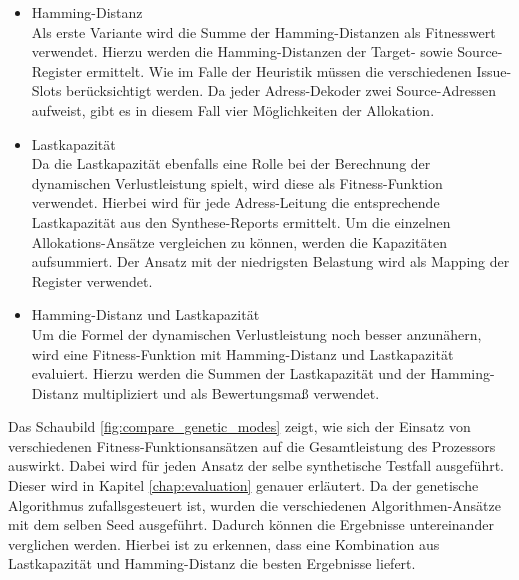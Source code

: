 \begin{itemize}
	\item Hamming-Distanz\\
		Als erste Variante wird die Summe der Hamming-Distanzen als Fitnesswert verwendet. Hierzu werden die Hamming-Distanzen der Target- sowie Source-Register ermittelt. Wie im Falle der Heuristik müssen die verschiedenen Issue-Slots berücksichtigt werden. Da jeder Adress-Dekoder zwei Source-Adressen aufweist, gibt es in diesem Fall vier Möglichkeiten der Allokation.
	\item Lastkapazität\\
		Da die Lastkapazität ebenfalls eine Rolle bei der Berechnung der dynamischen Verlustleistung spielt, wird diese als Fitness-Funktion verwendet. Hierbei wird für jede Adress-Leitung die entsprechende Lastkapazität aus den Synthese-Reports ermittelt. Um die einzelnen Allokations-Ansätze vergleichen zu können, werden die Kapazitäten aufsummiert. Der Ansatz mit der niedrigsten Belastung wird als Mapping der Register verwendet. \\
	\item Hamming-Distanz und Lastkapazität\\
		Um die Formel der dynamischen Verlustleistung noch besser anzunähern, wird eine Fitness-Funktion mit Hamming-Distanz und Lastkapazität evaluiert. Hierzu werden die Summen der Lastkapazität und der Hamming-Distanz multipliziert und als Bewertungsmaß verwendet.
\end{itemize}

Das Schaubild \ref{fig:compare_genetic_modes} zeigt, wie sich der Einsatz von verschiedenen Fitness-Funktionsansätzen auf die Gesamtleistung des Prozessors auswirkt. Dabei wird für jeden Ansatz der selbe synthetische Testfall ausgeführt. Dieser wird in Kapitel \ref{chap:evaluation} genauer erläutert. Da der genetische Algorithmus zufallsgesteuert ist, wurden die verschiedenen Algorithmen-Ansätze mit dem selben Seed ausgeführt. Dadurch können die Ergebnisse untereinander verglichen werden. Hierbei ist zu erkennen, dass eine Kombination aus Lastkapazität und Hamming-Distanz die besten Ergebnisse liefert. 

